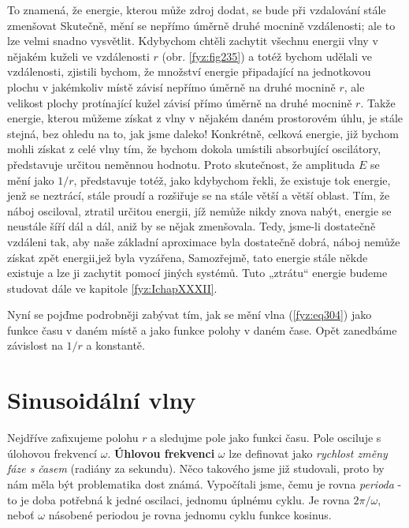 {    To znamená, že energie, kterou může zdroj dodat, se bude při vzdalování stále zmenšovat 
    Skutečně, mění se nepřímo úměrně druhé mocnině vzdálenosti; ale to lze velmi snadno vysvětlit. 
    Kdybychom chtěli zachytit všechnu energii vlny v nějakém kuželi ve vzdálenosti \(r\) (obr. 
    \ref{fyz:fig235}) a totéž bychom udělali ve vzdálenosti, zjistili bychom, že množství energie 
    připadající na jednotkovou plochu v jakémkoliv místě závisí nepřímo úměrně na druhé mocnině 
    \(r\), ale velikost plochy protínající kužel závisí přímo úměrně na druhé mocnině \(r\). Takže 
    energie, kterou můžeme získat z vlny v nějakém daném prostorovém úhlu, je stále stejná, bez 
    ohledu na to, jak jsme daleko! Konkrétně, celková energie, již bychom mohli získat z celé vlny 
    tím, že bychom dokola umístili absorbující oscilátory, představuje určitou neměnnou hodnotu. 
    Proto skutečnost, že amplituda \(E\) se mění jako \(1/r\), představuje totéž, jako kdybychom 
    řekli, že existuje tok energie, jenž se neztrácí, stále proudí a rozšiřuje se na stále větší a 
    větší oblast. Tím, že náboj osciloval, ztratil určitou energii, jíž nemůže nikdy znova nabýt, 
    energie se neustále šíří dál a dál, aniž by se nějak zmenšovala. Tedy, jsme-li dostatečně 
    vzdáleni tak, aby naše základní aproximace byla dostatečně dobrá, náboj nemůže získat zpět 
    energii,jež byla vyzářena, Samozřejmě, tato energie stále někde existuje a lze ji zachytit 
    pomocí jiných systémů. Tuto „ztrátu“ energie budeme studovat dále ve kapitole 
    \ref{fyz:IchapXXXII}.
    
    Nyní se pojďme podrobněji zabývat tím, jak se mění vlna (\ref{fyz:eq304}) jako funkce času v 
    daném místě a jako funkce polohy v daném čase. Opět zanedbáme závislost na \(1/r\) a konstantě.
    
  \section{Sinusoidální vlny}\label{fyz:IchapXXIXsecIII}
    Nejdříve zafixujeme polohu \(r\) a sledujme pole jako funkci času. Pole osciluje s úlohovou 
    frekvencí \(\omega\). \textbf{Úhlovou frekvenci} \(\omega\) lze definovat jako \emph{rychlost 
    změny fáze s časem} (radiány za sekundu). Něco takového jsme již studovali, proto by nám měla 
    být problematika dost známá. Vypočítali jsme, čemu je rovna \emph{perioda} - to je doba 
    potřebná k jedné oscilaci, jednomu úplnému cyklu. Je rovna \(2\pi/\omega\), neboť \(\omega\) 
    násobené periodou je rovna jednomu cyklu funkce kosinus.
    
}
